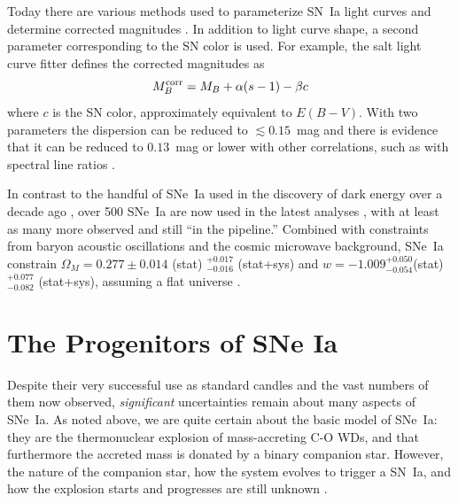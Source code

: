 Today there are various methods used to parameterize SN~Ia light
curves and determine corrected magnitudes
\citep[e.g.,][]{guy05a,guy07a,jha07a,conley08a}. In addition to light
curve shape, a second parameter corresponding to the SN color is
used. For example, the {\sc salt} light curve fitter \citep{guy05a}
defines the corrected magnitudes as
\begin{equation}
M_B^{\rm corr} = M_B + \alpha (s-1) -\beta c
\end{equation}
where $c$ is the SN color, approximately equivalent to $E(B-V)$. With two
parameters the dispersion can be reduced to $\lesssim 0.15$~mag and
there is evidence that it can be reduced to $0.13$~mag or lower with
other correlations, such as with spectral line ratios \citep{bailey09a}.

In contrast to the handful of SNe~Ia used in the discovery of dark
energy over a decade ago \citep{perlmutter97a,riess98a,perlmutter99a},
over 500 SNe~Ia are now used in the latest analyses
\citep[e.g.][]{hicken09a,amanullah10a}, with at least as many more
observed and still ``in the pipeline.'' Combined with constraints from
baryon acoustic oscillations and the cosmic microwave background,
SNe~Ia constrain $\Omega_M = 0.277 \pm 0.014$ (stat)
$^{+0.017}_{-0.016}$ (stat+sys) and $w = -1.009
^{+0.050}_{-0.054}$(stat) $^{+0.077}_{-0.082}$ (stat+sys), assuming a
flat universe \citep{amanullah10a}.


\section{The Progenitors of SNe Ia}

Despite their very successful use as standard candles and the vast
numbers of them now observed, \emph{significant} uncertainties remain
about many aspects of SNe~Ia.  As noted above, we are quite certain
about the basic model of SNe~Ia: they are the thermonuclear explosion
of mass-accreting C-O WDs, and that furthermore the accreted mass is
donated by a binary companion star.  However, the nature of the
companion star, how the system evolves to trigger a SN~Ia, and how the
explosion starts and progresses are still unknown 
\citep[see][for a review]{livio01a}.

